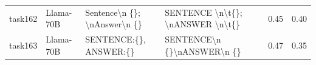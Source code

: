 \begin{longtable}{@{}p{0.8cm\tiny}p{1cm\tiny}p{4.1cm\ttfamily\tiny}p{4.1cm\ttfamily\tiny}p{0.8cm\tiny}p{0.8cm\tiny}@{}}
task162   & Llama-70B  & Sentence\textbackslash{}n \{\}; \textbackslash{}nAnswer\textbackslash{}n \{\}                                                                                                                                                                                                                                                                                                                                                                                                                                           & SENTENCE \textbackslash{}n\textbackslash{}t\{\}; \textbackslash{}nANSWER \textbackslash{}n\textbackslash{}t\{\}                                                                                                                                                                                                                                                                                                                                                                                                                                                                   & 0.45 & 0.40 \\
task163   & Llama-70B  & SENTENCE:\{\}, ANSWER:\{\}                                                                                                                                                                                                                                                                                                                                                                                                                                                                                              & SENTENCE\textbackslash{}n    \{\}\textbackslash{}nANSWER\textbackslash{}n    \{\}                                                                                                                                                                                                                                                                                                                                                                                                                                                                                                 & 0.47 & 0.35 \\

\end{longtable}

